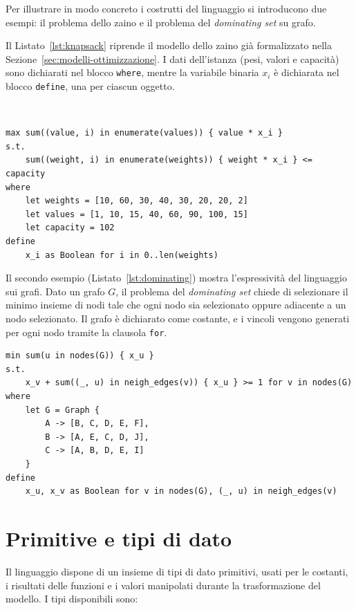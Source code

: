 Per illustrare in modo concreto i costrutti del linguaggio si introducono due
esempi: il problema dello zaino e
il problema del \emph{dominating set} su grafo.

Il Listato~\ref{lst:knapsack} riprende il modello dello zaino già formalizzato
nella Sezione~\ref{sec:modelli-ottimizzazione}. I dati dell'istanza (pesi,
valori e capacità) sono dichiarati nel blocco \texttt{where}, mentre la variabile
binaria $x_i$ è dichiarata nel blocco \texttt{define}, una per ciascun oggetto.

\

\begin{lstlisting}[caption={Il problema dello zaino in ROOC.}, label={lst:knapsack}]
max sum((value, i) in enumerate(values)) { value * x_i }
s.t.
    sum((weight, i) in enumerate(weights)) { weight * x_i } <= capacity
where
    let weights = [10, 60, 30, 40, 30, 20, 20, 2]
    let values = [1, 10, 15, 40, 60, 90, 100, 15]
    let capacity = 102
define
    x_i as Boolean for i in 0..len(weights)
\end{lstlisting}

Il secondo esempio (Listato~\ref{lst:dominating}) mostra l'espressività del
linguaggio sui grafi. Dato un grafo $G$, il problema del \emph{dominating set}
chiede di selezionare il minimo insieme di nodi tale che ogni nodo sia
selezionato oppure adiacente a un nodo selezionato. Il grafo è dichiarato come
costante, e i vincoli vengono generati per ogni nodo tramite la clausola
\texttt{for}.

\begin{lstlisting}[caption={Il problema del dominating set in ROOC.}, label={lst:dominating}]
min sum(u in nodes(G)) { x_u }
s.t.
    x_v + sum((_, u) in neigh_edges(v)) { x_u } >= 1 for v in nodes(G)
where
    let G = Graph {
        A -> [B, C, D, E, F],
        B -> [A, E, C, D, J],
        C -> [A, B, D, E, I]
    }
define
    x_u, x_v as Boolean for v in nodes(G), (_, u) in neigh_edges(v)
\end{lstlisting}

\section{Primitive e tipi di dato}
\label{sec:primitive}

Il linguaggio dispone di un insieme di tipi di dato primitivi, usati per le
costanti, i risultati delle funzioni e i valori manipolati durante la
trasformazione del modello. I tipi disponibili sono:

